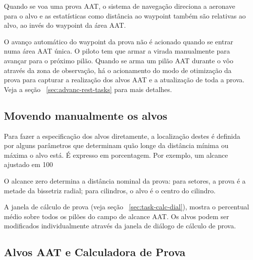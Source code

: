 Quando se voa uma prova AAT, o sistema de navegação direciona a aeronave para o alvo e as estatísticas como distância ao waypoint também são relativas ao alvo, ao invés do waypoint da área AAT.

O avanço automático do waypoint da prova não é acionado quando se entrar numa área AAT única.  O piloto tem que armar a virada manualmente para avançar para o próximo pilão.  Quando se arma um pilão AAT durante o vôo através da zona de observação, há o acionamento do modo de otimização da prova para capturar a realização dos alvos AAT e a atualização de toda a prova.   Veja a seção ~\ref{sec:advanc-rest-tasks} 
para mais detalhes.

\subsection*{Movendo manualmente os alvos}

Para fazer a especificação dos alvos diretamente, a localização destes é definida por alguns parâmetros que determinam quão longe da distância mínima ou máxima o alvo está. É expresso em porcentagem.  Por exemplo, um alcance ajustado em 100%

O alcance zero determina a distância nominal da prova:  para setores, a prova é a metade da bissetriz radial; para cilindros, o alvo é o centro do cilindro.

A janela de cálculo de prova (veja seção ~\ref{sec:task-calc-dial}), mostra o percentual médio sobre todos os pilões do campo de alcance AAT.  Os alvos podem ser modificados individualmente através da janela de diálogo de cálculo de prova.


\subsection*{Alvos AAT e Calculadora de Prova}

